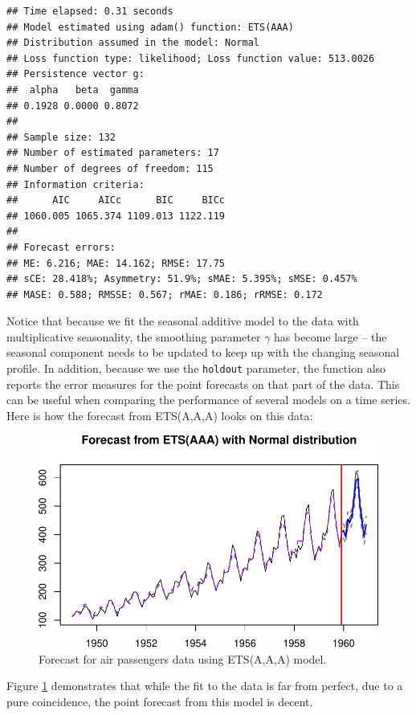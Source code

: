 \documentclass[]{book}
\theoremstyle{definition}
\theoremstyle{definition}
\theoremstyle{definition}
\theoremstyle{definition}
\theoremstyle{remark}
\begin{document}
\begin{verbatim}
## Time elapsed: 0.31 seconds
## Model estimated using adam() function: ETS(AAA)
## Distribution assumed in the model: Normal
## Loss function type: likelihood; Loss function value: 513.0026
## Persistence vector g:
##  alpha   beta  gamma 
## 0.1928 0.0000 0.8072 
## 
## Sample size: 132
## Number of estimated parameters: 17
## Number of degrees of freedom: 115
## Information criteria:
##      AIC     AICc      BIC     BICc 
## 1060.005 1065.374 1109.013 1122.119 
## 
## Forecast errors:
## ME: 6.216; MAE: 14.162; RMSE: 17.75
## sCE: 28.418%; Asymmetry: 51.9%; sMAE: 5.395%; sMSE: 0.457%
## MASE: 0.588; RMSSE: 0.567; rMAE: 0.186; rRMSE: 0.172
\end{verbatim}

Notice that because we fit the seasonal additive model to the data with multiplicative seasonality, the smoothing parameter \(\gamma\) has become large -- the seasonal component needs to be updated to keep up with the changing seasonal profile. In addition, because we use the \texttt{holdout} parameter, the function also reports the error measures for the point forecasts on that part of the data. This can be useful when comparing the performance of several models on a time series. Here is how the forecast from ETS(A,A,A) looks on this data:

\begin{figure}
\centering
\includegraphics{Svetunkov--2022----ADAM_files/figure-latex/AirPassengersAAAForecast-1.pdf}
\caption{\label{fig:AirPassengersAAAForecast}Forecast for air passengers data using ETS(A,A,A) model.}
\end{figure}

Figure \ref{fig:AirPassengersAAAForecast} demonstrates that while the fit to the data is far from perfect, due to a pure coincidence, the point forecast from this model is decent.
\end{document}
